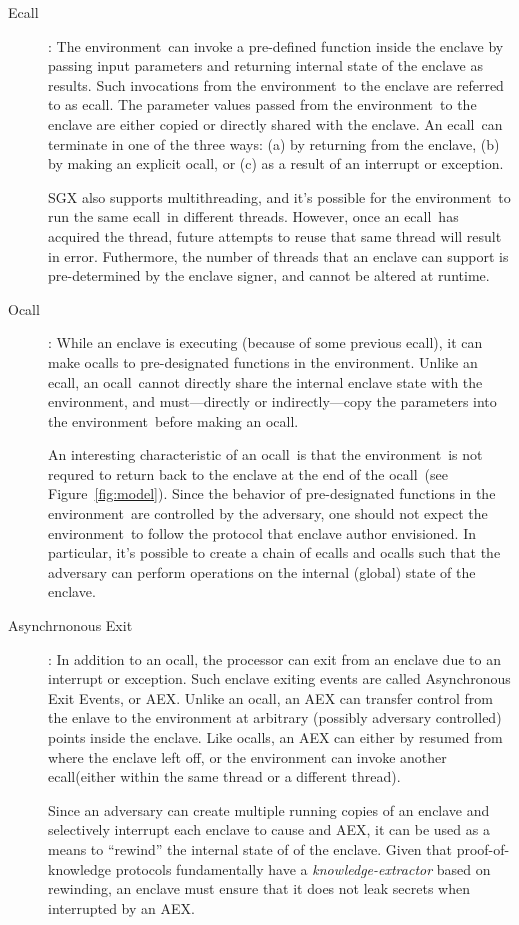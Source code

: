 \documentclass[10pt]{article}
\newcommand{\ecall}{\textsf{ecall}}
\newcommand{\ocall}{\textsf{ocall}}
\newcommand{\env}{\textsf{environment}}
\begin{document}
  \begin{description}
  \item[Ecall]: The \env\ can invoke a pre-defined function inside the
    enclave by passing input parameters and returning internal state
    of the enclave as results. Such invocations from the \env\ to the
    enclave are referred to as \ecall. The parameter values passed
    from the \env\ to the enclave are either copied or directly shared
    with the enclave. An \ecall\ can terminate in one of the three
    ways: (a) by returning from the enclave, (b) by making an explicit
    \ocall, or (c) as a result of an interrupt or exception.

    SGX also supports multithreading, and it's possible for the
    \env\ to run the same \ecall\ in different threads. However, once
    an \ecall\ has acquired the thread, future attempts to reuse that
    same thread will result in error. Futhermore, the number of
    threads that an enclave can support is pre-determined by the
    enclave signer, and cannot be altered at runtime.

  \item [Ocall]: While an enclave is executing (because of some
    previous \ecall), it can make \ocall s  to pre-designated
    functions in the \env.  Unlike an \ecall, an \ocall\ cannot
    directly share the internal enclave state with the \env, and
    must---directly or indirectly---copy the parameters into the
    \env\ before making an \ocall.

    An interesting characteristic of an \ocall\ is that the \env\ is
    not requred to return back to the enclave at the end of the
    \ocall\ (see Figure~\ref{fig:model}). Since the behavior of pre-designated
    functions in the \env\ are controlled by the adversary, one should
    not expect the \env\ to follow the protocol that enclave author
    envisioned. In particular, it's possible to create a chain of
    \ecall s and \ocall s such that the adversary can perform
    operations on the internal (global) state of the enclave.

  \item[Asynchrnonous Exit]: In addition to an \ocall, the
    processor can exit from an enclave due to an interrupt or
    exception. Such enclave exiting events are called Asynchronous
    Exit Events, or AEX. Unlike an \ocall, an AEX can transfer control
    from the enlave to the environment at arbitrary (possibly adversary
    controlled) points inside the enclave. Like \ocall s, an AEX can
    either by resumed from where the enclave left off, or the
    environment can invoke another \ecall (either within the same
    thread or a different thread).

    Since an adversary can create multiple running copies of an
    enclave and selectively interrupt each enclave to cause and AEX,
    it can be used as a means to ``rewind'' the internal state of of
    the enclave. Given that proof-of-knowledge \cite{BellarePOK}
    protocols fundamentally have a \textit{knowledge-extractor} based
    on rewinding, an enclave must ensure that it does not leak secrets
    when interrupted by an AEX.

  \end{description}
\end{document}
